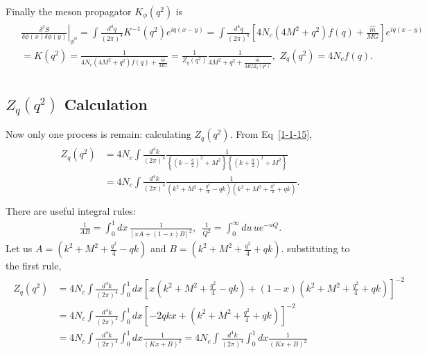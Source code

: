 \documentclass[tightenlines,floatfix,nofootinbib,superscriptaddress,fleqn]{revtex4-2}
\begin{document}
Finally the meson propagator $K_\phi(q^2)$ is
\begin{align}
  \begin{split}
  &\left.\frac{\delta^2S}{\delta\phi(x)\delta\phi(y)}\right|_{\phi^0}
    =\int\frac{d^4q}{(2\pi)^4}K^{-1}(q^2)e^{iq(x-y)}
    =\int\frac{d^4q}{(2\pi)^4}
    \left[
      4N_c(4M^2+q^2)f(q)
      +\frac{\hat{m}}{MG}
    \right]e^{iq(x-y)}  \\
    &= K(q^2)=\frac{1}{ 4N_c(4M^2+q^2)f(q)
    +\frac{\hat{m}}{MG}}
    =\frac{1}{Z_q(q^2)}\frac{1}{4M^2+q^2
    +\frac{\hat{m}}{MGZ_q(q^2)}},\,\,
    Z_q(q^2)=4N_cf(q).
  \end{split}
\end{align}
\subsection{$Z_q(q^2)$ Calculation}
Now only one process is remain: calculating $Z_q(q^2)$.
From Eq~\eqref{1-1-15},
\begin{align}
  \begin{split}
    Z_q(q^2)&=4N_c\int\frac{d^4k}{(2\pi)^4}\frac{1}
    {\left\{\left(k-\frac{q}{2}\right)^2+M^2\right\}
    \left\{\left(k+\frac{q}{2}\right)^2+M^2\right\}}  \\
    &=4N_c\int\frac{d^4k}{(2\pi)^4}\frac{1}
    {\left(k^2+M^2+\frac{q^2}{4}-qk\right)
     \left(k^2+M^2+\frac{q^2}{4}+qk\right)}.
    \\
  \end{split}
\end{align}
There are useful integral rules:
\begin{align}
  \frac{1}{AB}=\int^1_0dx\,\frac{1}{[xA+(1-x)B]^2},\,\,\,
  \frac{1}{Q^2}=\int_0^\infty du\,ue^{-uQ}.
\end{align}
Let us $A = \left(k^2+M^2+\frac{q^2}{4}-qk\right)$
and $B = \left(k^2+M^2+\frac{q^2}{4}+qk\right)$. substituting
to the first rule,
\begin{align}
  \begin{split}
    Z_q(q^2)
    &=4N_c\int\frac{d^4k}{(2\pi)^4}
    \int^1_0dx
    \left[
      x\left(k^2+M^2+\frac{q^2}{4}-qk\right)
      +(1-x)\left(k^2+M^2+\frac{q^2}{4}+qk\right)
      \right]^{-2}  \\
      &=4N_c\int\frac{d^4k}{(2\pi)^4}
    \int^1_0dx
    \left[
      -2qkx
      +\left(k^2+M^2+\frac{q^2}{4}+qk\right)
      \right]^{-2}  \\
      &= 4N_c\int\frac{d^4k}{(2\pi)^4}
      \int^1_0dx
      \frac{1}{(Kx+B)^2}
      = 4N_c\int\frac{d^4k}{(2\pi)^4}
      \int^1_0dx
      \frac{1}{(Kx+B)^2}
  \end{split}
\end{align}
\end{document}
